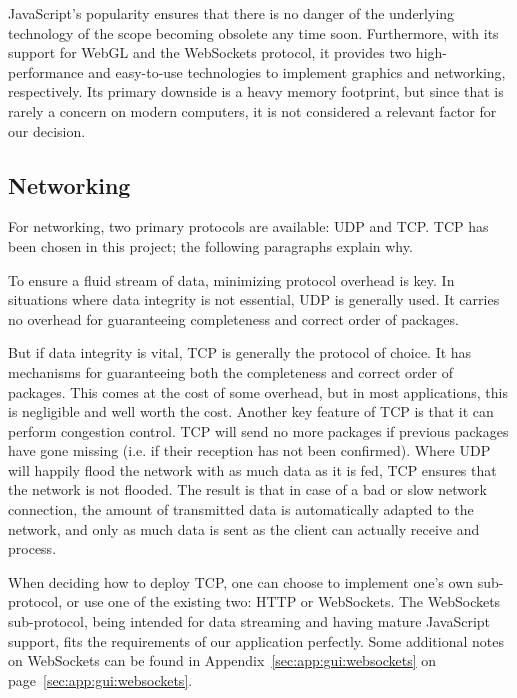 JavaScript's  popularity ensures  that there  is no  danger of  the underlying
technology  of  the  scope   becoming  obsolete  any  time  soon. Furthermore,
with  its support  for  WebGL and  the WebSockets  protocol,  it provides  two
high-performance  and  easy-to-use  technologies  to  implement  graphics  and
networking, respectively. Its  primary downside  is a heavy  memory footprint,
but since that is rarely a concern on modern computers, it is not considered a
relevant factor for our decision.

%
%
\subsection{Networking} %
\label{subsec:gui:networking}

For networking, two primary protocols are available: UDP and TCP. TCP has been
chosen in this project; the following paragraphs explain why.

To ensure  a fluid  stream of  data, minimizing  protocol overhead  is key. In
situations where  data integrity is  not essential, UDP is  generally used. It
carries  no  overhead  for  guaranteeing completeness  and  correct  order  of
packages.

But if  data integrity is vital,  TCP is generally the  protocol of choice. It
has mechanisms  for guaranteeing  both the completeness  and correct  order of
packages.  This comes at the cost  of some overhead, but in most applications,
this is negligible and well worth the cost. Another key feature of TCP is that
it can perform congestion control. TCP will  send no more packages if previous
packages have gone  missing (i.e. if their reception has  not been confirmed).
Where UDP will happily  flood the network with as much data as  it is fed, TCP
ensures that the network  is not flooded. The result is that in  case of a bad
or slow  network connection, the  amount of transmitted data  is automatically
adapted  to the  network, and  only as  much data  is sent  as the  client can
actually receive and process.

When  deciding how  to  deploy TCP,  one  can choose  to  implement one's  own
sub-protocol,  or  use  one  of   the  existing  two: HTTP  or  WebSockets. The
WebSockets  sub-protocol,   being  intended  for  data   streaming  and  having
mature  JavaScript   support,  fits   the  requirements  of   our  application
perfectly.    Some  additional   notes   on  WebSockets   can   be  found   in
Appendix~\ref{sec:app:gui:websockets} on page~\ref{sec:app:gui:websockets}.

